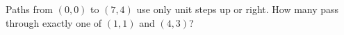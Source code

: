 Paths from $(0,0)$ to $(7,4)$ use only unit steps up or right. How many pass through exactly one of $(1,1)$ and $(4,3)$?
